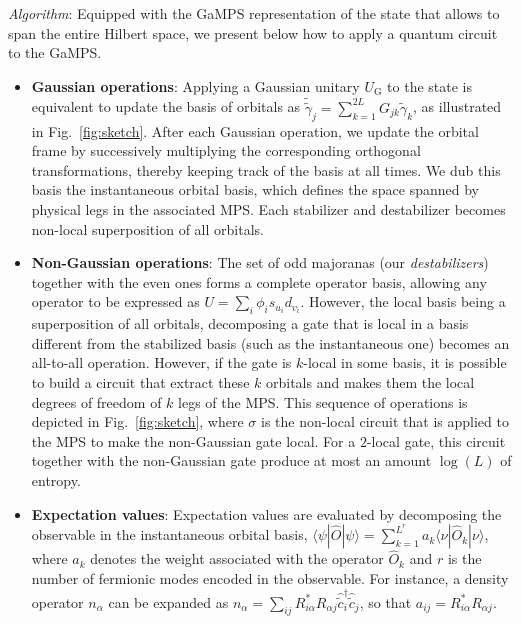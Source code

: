 \documentclass[a4paper, twocolumn, superscriptaddress, longbibliography]{revtex4-2}
\begin{document}
	\emph{Algorithm}: Equipped with the GaMPS representation of the state that allows to span the entire Hilbert space, we present below how to apply a quantum circuit to the GaMPS.
	\begin{itemize}
		\item {\bf Gaussian operations}: Applying a Gaussian unitary $U_{\mathrm{G}}$ to the state is equivalent to update the basis of orbitals as $\tilde{\tilde{\gamma}}_j = \sum_{k=1}^{2L} G_{jk}\tilde{\gamma}_{k}$, as illustrated in Fig.~\ref{fig:sketch}. After each Gaussian operation, we update the orbital frame by successively multiplying the corresponding orthogonal transformations, thereby keeping track of the basis at all times. We dub this basis the instantaneous orbital basis, which defines the space spanned by physical legs in the associated MPS. Each stabilizer and destabilizer becomes non-local superposition of all orbitals. 
		\item {\bf Non-Gaussian operations}: The set of odd majoranas (our \emph{destabilizers}) together with the even ones  forms a complete operator basis, allowing any operator to be expressed as $U = \sum_{i} \phi_{i} s_{u_i}d_{v_i}$. However, the local basis being a superposition of all orbitals, decomposing a gate that is local in a basis different from the stabilized basis (such as the instantaneous one) becomes an all-to-all operation. However, if the gate is $k$-local in some basis, it is possible to build a circuit that extract these $k$ orbitals and makes them the local degrees of freedom of $k$ legs of the MPS. This sequence of operations is depicted in Fig.~\ref{fig:sketch}, where $\sigma$ is the non-local circuit that is applied to the MPS to make the non-Gaussian gate local. For a $2$-local gate, this circuit together with the non-Gaussian gate produce at most an amount $\log(L)$ of entropy.
		\item {\bf Expectation values}: Expectation values are evaluated by decomposing the observable in the instantaneous orbital basis, $\langle \psi | \hat{O} | \psi \rangle = \sum_{k=1}^{L^{r}} a_{k}\langle \nu | \hat{O}_k | \nu \rangle$, where $a_k$ denotes the weight associated with the operator $\hat{O}_{k}$ and $r$ is the number of fermionic modes encoded in the observable. For instance, a density operator $n_\alpha$ can be expanded as $n_\alpha = \sum_{ij} R^{*}_{i\alpha} R_{\alpha j} \hat{\tilde{c}}^{\dagger}_{i}\hat{\tilde{c}}^{}_{j}$, so that $a_{ij} = R^{*}_{i\alpha} R_{\alpha j}$.
	\end{itemize}
	
\end{document}
